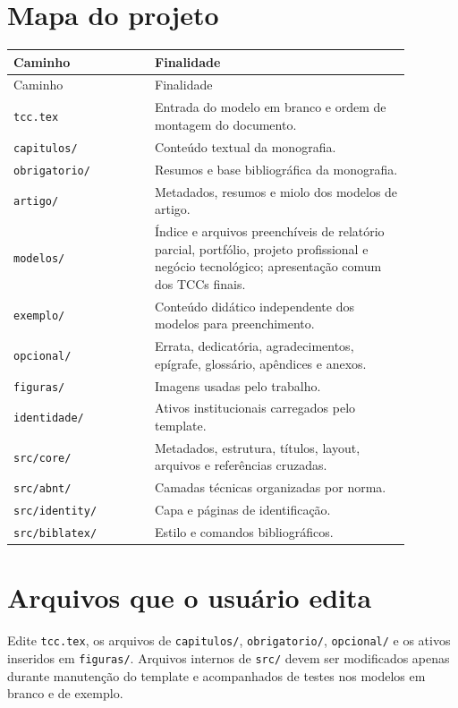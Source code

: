 \section{Mapa do projeto}

\begin{longtable}{p{0.31\linewidth}p{0.57\linewidth}}
\toprule
Caminho & Finalidade \\
\midrule
\endfirsthead
\toprule
Caminho & Finalidade \\
\midrule
\endhead
\texttt{tcc.tex} & Entrada do modelo em branco e ordem de montagem do documento. \\
\texttt{capitulos/} & Conteúdo textual da monografia. \\
\texttt{obrigatorio/} & Resumos e base bibliográfica da monografia. \\
\texttt{artigo/} & Metadados, resumos e miolo dos modelos de artigo. \\
\texttt{modelos/} & Índice e arquivos preenchíveis de relatório parcial, portfólio, projeto profissional e negócio tecnológico; apresentação comum dos TCCs finais. \\
\texttt{exemplo/} & Conteúdo didático independente dos modelos para preenchimento. \\
\texttt{opcional/} & Errata, dedicatória, agradecimentos, epígrafe, glossário, apêndices e anexos. \\
\texttt{figuras/} & Imagens usadas pelo trabalho. \\
\texttt{identidade/} & Ativos institucionais carregados pelo template. \\
\texttt{src/core/} & Metadados, estrutura, títulos, layout, arquivos e referências cruzadas. \\
\texttt{src/abnt/} & Camadas técnicas organizadas por norma. \\
\texttt{src/identity/} & Capa e páginas de identificação. \\
\texttt{src/biblatex/} & Estilo e comandos bibliográficos. \\
\bottomrule
\end{longtable}

\section{Arquivos que o usuário edita}

Edite \texttt{tcc.tex}, os arquivos de \texttt{capitulos/}, \texttt{obrigatorio/}, \texttt{opcional/} e os ativos inseridos em \texttt{figuras/}. Arquivos internos de \texttt{src/} devem ser modificados apenas durante manutenção do template e acompanhados de testes nos modelos em branco e de exemplo.

